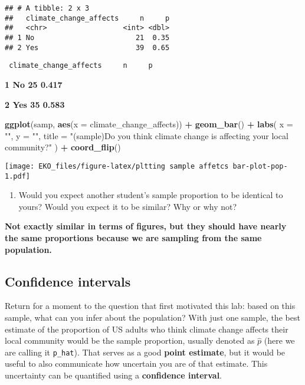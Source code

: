 \documentclass[
]{article}
\newenvironment{Shaded}{\begin{snugshade}}{\end{snugshade}}
\newcommand{\AttributeTok}[1]{\textcolor[rgb]{0.13,0.29,0.53}{#1}}
\newcommand{\FunctionTok}[1]{\textcolor[rgb]{0.13,0.29,0.53}{\textbf{#1}}}
\newcommand{\NormalTok}[1]{#1}
\newcommand{\SpecialCharTok}[1]{\textcolor[rgb]{0.81,0.36,0.00}{\textbf{#1}}}
\newcommand{\StringTok}[1]{\textcolor[rgb]{0.31,0.60,0.02}{#1}}
\providecommand{\tightlist}{%
  \setlength{\itemsep}{0pt}\setlength{\parskip}{0pt}}
\begin{document}
\begin{verbatim}
## # A tibble: 2 x 3
##   climate_change_affects     n     p
##   <chr>                  <int> <dbl>
## 1 No                        21  0.35
## 2 Yes                       39  0.65
\end{verbatim}

\begin{verbatim}
 climate_change_affects     n     p
\end{verbatim}

\textbf{1 No 25 0.417}

\textbf{2 Yes 35 0.583}

\begin{Shaded}
\begin{Highlighting}[]
\FunctionTok{ggplot}\NormalTok{(samp, }\FunctionTok{aes}\NormalTok{(}\AttributeTok{x =}\NormalTok{ climate\_change\_affects)) }\SpecialCharTok{+}
  \FunctionTok{geom\_bar}\NormalTok{() }\SpecialCharTok{+}
  \FunctionTok{labs}\NormalTok{(}
    \AttributeTok{x =} \StringTok{""}\NormalTok{, }\AttributeTok{y =} \StringTok{""}\NormalTok{,}
    \AttributeTok{title =} \StringTok{"(sample)Do you think climate change is affecting your local community?"}
\NormalTok{  ) }\SpecialCharTok{+}
  \FunctionTok{coord\_flip}\NormalTok{() }
\end{Highlighting}
\end{Shaded}

\texttt{[image: EKO\_files/figure-latex/pltting sample affetcs bar-plot-pop-1.pdf]}

\begin{enumerate}
\def\labelenumi{\arabic{enumi}.}
\tightlist
\item
  Would you expect another student's sample proportion to be identical
  to yours? Would you expect it to be similar? Why or why not?
\end{enumerate}

\textbf{Not exactly similar in terms of figures, but they should have
nearly the same proportions because we are sampling from the same
population.}

\subsection{Confidence intervals}\label{confidence-intervals}

Return for a moment to the question that first motivated this lab: based
on this sample, what can you infer about the population? With just one
sample, the best estimate of the proportion of US adults who think
climate change affects their local community would be the sample
proportion, usually denoted as \(\hat{p}\) (here we are calling it
\texttt{p\_hat}). That serves as a good \textbf{point estimate}, but it
would be useful to also communicate how uncertain you are of that
estimate. This uncertainty can be quantified using a \textbf{confidence
interval}.
\end{document}
